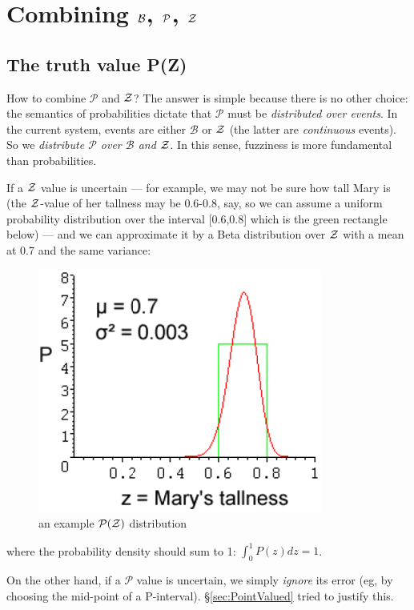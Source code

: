 \section{Combining $\mathcal{B}$, $\mathcal{P}$, $\mathcal{Z}$}
\label{sec:combinePZ}

\subsection{The truth value P(Z)}
\label{sec:P(Z)-defined}

How to combine $\mathcal{P}$ and $\mathcal{Z}$?  The answer is simple because there is no other choice:  the semantics of probabilities dictate that $\mathcal{P}$ must be \textit{distributed over events}.  In the current system, events are either $\mathcal{B}$ or $\mathcal{Z}$ (the latter are \textit{continuous} events).  So we \emph{distribute $\mathcal{P}$ over $\mathcal{B}$ and $\mathcal{Z}$}.  In this sense, fuzziness is more fundamental than probabilities.

If a $\mathcal{Z}$ value is uncertain --- for example, we may not be sure how tall Mary is (the $\mathcal{Z}$-value of her tallness may be 0.6-0.8, say, so we can assume a uniform probability distribution over the interval [0.6,0.8] which is the green rectangle below) --- and we can approximate it by a Beta distribution over $\mathcal{Z}$ with a mean at 0.7 and the same variance:
\begin{figure}[H]
\centering
\includegraphics[scale=0.9]{P-over-Z-Marys-Tallness2.png}
\caption{an example $\mathcal{P}(\mathcal{Z})$ distribution}
\end{figure}
where the probability density should sum to 1: $ \int^1_0 P(z) dz = 1 $.

On the other hand, if a $\mathcal{P}$ value is uncertain, we simply \textit{ignore} its error (eg, by choosing the mid-point of a P-interval).  \S\ref{sec:PointValued} tried to justify this.

